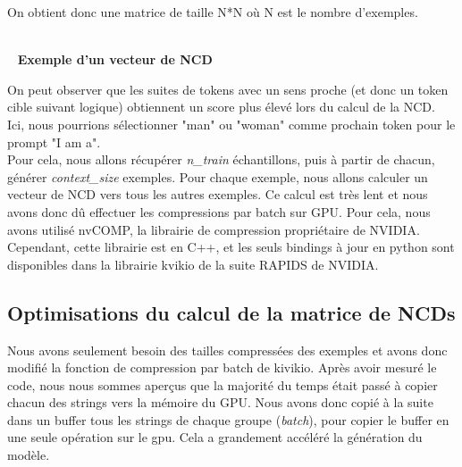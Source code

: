 \documentclass[12pt]{article}
\begin{document}
On obtient donc une matrice de taille N*N où N est le nombre d'exemples.\\

\begin{center}
    
    
    ~\\~\textbf{ Exemple d'un vecteur de NCD}
    
\end{center}

On peut observer que les suites de tokens avec un sens proche (et donc un token cible suivant logique) obtiennent un score plus élevé lors du calcul de la NCD. \\
Ici, nous pourrions sélectionner "man" ou "woman" comme prochain token pour le prompt "I am a". \\

Pour cela, nous allons récupérer \textit{n\_train} échantillons, puis à partir de chacun, générer \textit{context\_size} exemples. 
Pour chaque exemple, nous allons calculer un vecteur de NCD vers tous les autres exemples. Ce calcul est très lent et nous avons donc dû effectuer les compressions par batch sur GPU. Pour cela, nous avons utilisé nvCOMP\cite{nvcomp}, la librairie de compression propriétaire de NVIDIA. Cependant, cette librairie est en C++, et les seuls bindings à jour en python sont disponibles dans la librairie kvikio \cite{kvikio} de la suite RAPIDS\cite{rapidsai} de NVIDIA. 

\subsection{Optimisations du calcul de la matrice de NCDs}
Nous avons seulement besoin des tailles compressées des exemples et avons donc modifié la fonction de compression par batch de kivikio\cite{kvikio}. Après avoir mesuré le code, nous nous sommes aperçus que la majorité du temps était passé à copier chacun des strings vers la mémoire du GPU. Nous avons donc copié à la suite dans un buffer tous les strings de chaque groupe (\textit{batch}), pour copier le buffer en une seule opération sur le gpu. Cela a grandement accéléré la génération du modèle.
\end{document}
